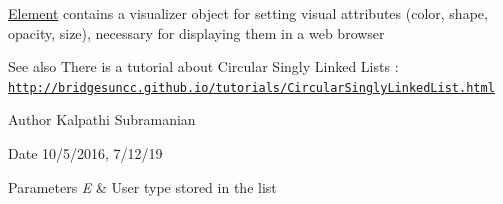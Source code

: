 \mbox{\hyperlink{classbridges_1_1datastructure_1_1_element}{Element}} contains a visualizer object for setting visual attributes (color, shape, opacity, size), necessary for displaying them in a web browser

\begin{DoxySeeAlso}{See also}
There is a tutorial about Circular Singly Linked Lists \+: \href{http://bridgesuncc.github.io/tutorials/CircularSinglyLinkedList.html}{\tt http\+://bridgesuncc.\+github.\+io/tutorials/\+Circular\+Singly\+Linked\+List.\+html}
\end{DoxySeeAlso}
\begin{DoxyAuthor}{Author}
Kalpathi Subramanian 
\end{DoxyAuthor}
\begin{DoxyDate}{Date}
10/5/2016, 7/12/19
\end{DoxyDate}

\begin{DoxyParams}{Parameters}
{\em E} & User type stored in the list \\
\hline
\end{DoxyParams}

